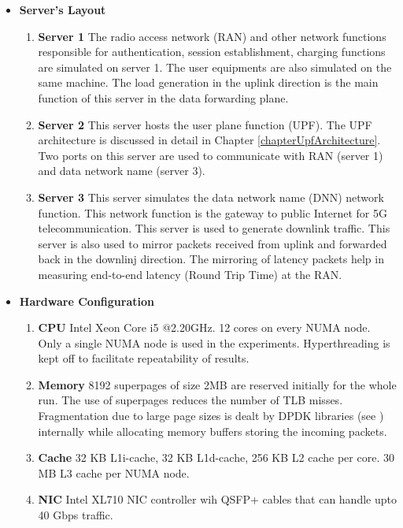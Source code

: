  \begin{itemize} 
        \item \textbf{Server's Layout}
        \begin{enumerate}
                \item \textbf{Server 1} The radio access network (RAN) and other network functions responsible for authentication,
         session establishment, charging functions are simulated on server 1.  The user equipments are also 
         simulated on the same machine. The load generation in the uplink direction is the main function of this server in the data forwarding plane.
                \item \textbf{Server 2} This server hosts the user plane function (UPF). The UPF architecture is discussed 
         in detail in Chapter \ref{chapterUpfArchitecture}. Two ports on this server are used to communicate with RAN 
         (server 1) and data network name (server 3).
                 \item \textbf{Server 3} This server simulates the data network name (DNN) network function. This network 
        function is the gateway to public Internet for 5G telecommunication. This server is used to generate downlink traffic. This server is also used to mirror packets received from uplink and forwarded back in the downlinj direction. The mirroring of latency packets help in measuring end-to-end latency (Round Trip Time) at the RAN. 
        \end{enumerate} 
        \item \textbf{Hardware Configuration} 
        \begin{enumerate}
                \item \textbf{CPU} Intel Xeon Core i5 @2.20GHz. 12 cores on every NUMA node. Only a single NUMA node is used in the experiments. Hyperthreading is kept off to facilitate repeatability of results.
                \item \textbf{Memory} 8192 superpages of size 2MB are reserved initially for the whole run. The use of superpages reduces the number of TLB misses. Fragmentation due to large page sizes is dealt by DPDK libraries (see \cite{memblogdpdk}) internally while allocating memory buffers storing the incoming packets.
                \item \textbf{Cache} 32 KB L1i-cache, 32 KB L1d-cache, 256 KB L2 cache per core. 30 MB L3 cache per NUMA node. 
                \item \textbf{NIC} Intel XL710 NIC controller wih QSFP+ cables that  can handle upto 40 Gbps traffic.
        \end{enumerate}
        
\end{itemize}

